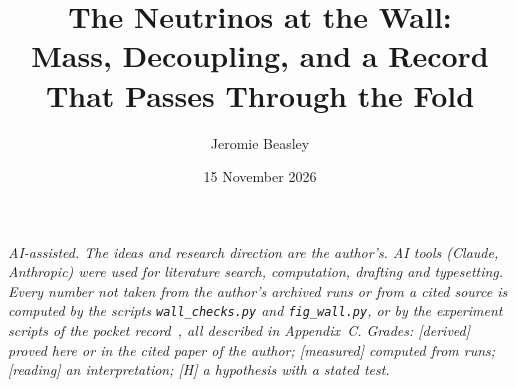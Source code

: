 \documentclass[11pt]{article}
\title{The Neutrinos at the Wall:\\ Mass, Decoupling, and a Record That Passes Through the Fold}
\author{Jeromie Beasley}
\date{15 November 2026}
\theoremstyle{definition}\newtheorem{hypothesis}{Hypothesis}\newtheorem{prediction}{Prediction}
\theoremstyle{remark}\newtheorem{remark}[theorem]{Remark}
\newcommand{\grade}[1]{\textsf{\small[#1]}}
\begin{document}
\maketitle

\noindent\emph{AI-assisted. The ideas and research direction are the author's. AI tools (Claude, Anthropic) were used for literature search, computation, drafting and typesetting. Every number not taken from the author's archived runs or from a cited source is computed by the scripts \texttt{wall\_checks.py} and \texttt{fig\_wall.py}, or by the experiment scripts of the pocket record~\cite{Pocket}, all described in Appendix~C. Grades: \grade{derived} proved here or in the cited paper of the author; \grade{measured} computed from runs; \grade{reading} an interpretation; \grade{H} a hypothesis with a stated test.}
\end{document}
